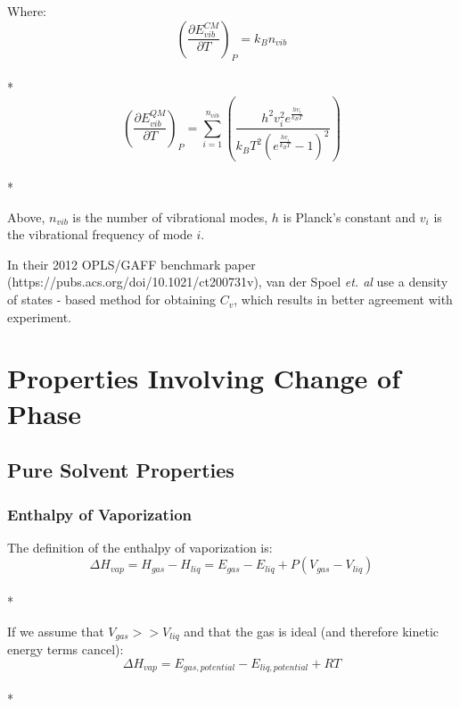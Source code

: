 \documentclass[aps,pre,twocolumn,nofootinbib,superscriptaddress,linenumbers,10pt, draft,tightenlines]{revtex4-1}
\begin{document}
Where:
\begin{equation}\left(\frac{\partial E_{vib}^{CM}}{\partial T}\right)_{P} = k_B n_{vib}\end{equation}\\*
\begin{equation}\left(\frac{\partial E_{vib}^{QM}}{\partial T}\right)_{P} = \sum_{i=1}^{n_{vib}} \left(\frac{h^2 v_{i}^2 e^{\frac{h v_{i}}{k_B T}}}{k_B T^2 \left(e^{\frac{h v_{i}}{k_B T}} - 1\right)^2}\right)\end{equation}\\*

Above, $n_{vib}$ is the number of vibrational modes, $h$ is Planck's constant and $v_i$ is the vibrational frequency of mode $i$.

In their 2012 OPLS/GAFF benchmark paper (https://pubs.acs.org/doi/10.1021/ct200731v), van der Spoel \emph{et. al} use a density of states - based method for obtaining $C_v$, which results in better agreement with experiment. 


\section{Properties Involving Change of Phase}
\subsection{Pure Solvent Properties}
\subsubsection{Enthalpy of Vaporization}

The definition of the enthalpy of vaporization is\cite{hvap}:
\begin{equation}\Delta H_{vap} = H_{gas} - H_{liq} = E_{gas} - E_{liq} + P(V_{gas} - V_{liq})\end{equation}\\*

If we assume that $V_{gas} >> V_{liq}$ and that the gas is ideal (and therefore kinetic energy terms cancel):
\begin{equation}\Delta H_{vap} = E_{gas, potential} - E_{liq, potential} + R T\end{equation}\\*
\end{document}
